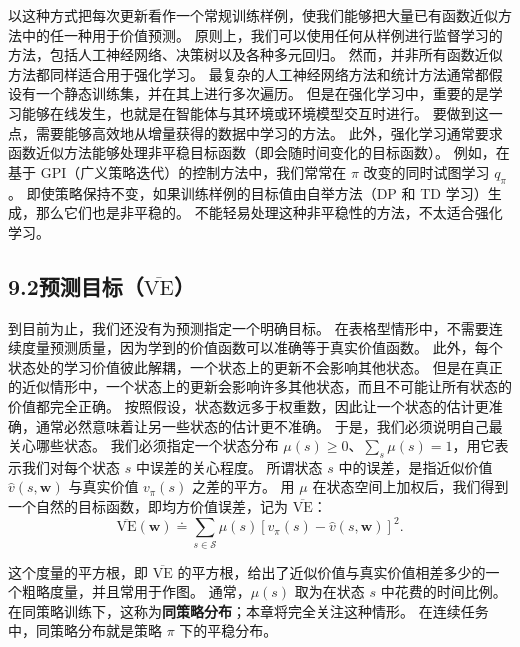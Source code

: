 \documentclass[UTF8, 12pt, fontset=fandol, oneside]{ctexart}
\begin{document}
以这种方式把每次更新看作一个常规训练样例，使我们能够把大量已有函数近似方法中的任一种用于价值预测。
原则上，我们可以使用任何从样例进行监督学习的方法，包括人工神经网络、决策树以及各种多元回归。
然而，并非所有函数近似方法都同样适合用于强化学习。
最复杂的人工神经网络方法和统计方法通常都假设有一个静态训练集，并在其上进行多次遍历。
但是在强化学习中，重要的是学习能够在线发生，也就是在智能体与其环境或环境模型交互时进行。
要做到这一点，需要能够高效地从增量获得的数据中学习的方法。
此外，强化学习通常要求函数近似方法能够处理非平稳目标函数（即会随时间变化的目标函数）。
例如，在基于 GPI（广义策略迭代）的控制方法中，我们常常在 $\pi$ 改变的同时试图学习 $q_\pi$。
即使策略保持不变，如果训练样例的目标值由自举方法（DP 和 TD 学习）生成，那么它们也是非平稳的。
不能轻易处理这种非平稳性的方法，不太适合强化学习。

\subsection*{9.2\quad 预测目标（$\overline{\mathrm{VE}}$）}

到目前为止，我们还没有为预测指定一个明确目标。
在表格型情形中，不需要连续度量预测质量，因为学到的价值函数可以准确等于真实价值函数。
此外，每个状态处的学习价值彼此解耦，一个状态上的更新不会影响其他状态。
但是在真正的近似情形中，一个状态上的更新会影响许多其他状态，而且不可能让所有状态的价值都完全正确。
按照假设，状态数远多于权重数，因此让一个状态的估计更准确，通常必然意味着让另一些状态的估计更不准确。
于是，我们必须说明自己最关心哪些状态。
我们必须指定一个状态分布 $\mu(s)\ge 0$、$\sum_s\mu(s)=1$，用它表示我们对每个状态 $s$ 中误差的关心程度。
所谓状态 $s$ 中的误差，是指近似价值 $\hat{v}(s,\mathbf{w})$ 与真实价值 $v_\pi(s)$ 之差的平方。
用 $\mu$ 在状态空间上加权后，我们得到一个自然的目标函数，即均方价值误差，记为 $\overline{\mathrm{VE}}$：
\begin{equation}
\overline{\mathrm{VE}}(\mathbf{w})\doteq
\sum_{s\in\mathcal{S}}\mu(s)\left[v_\pi(s)-\hat{v}(s,\mathbf{w})\right]^2.
\tag{9.1}
\end{equation}

这个度量的平方根，即 $\overline{\mathrm{VE}}$ 的平方根，给出了近似价值与真实价值相差多少的一个粗略度量，并且常用于作图。
通常，$\mu(s)$ 取为在状态 $s$ 中花费的时间比例。
在同策略训练下，这称为\textbf{同策略分布}；本章将完全关注这种情形。
在连续任务中，同策略分布就是策略 $\pi$ 下的平稳分布。
\end{document}
